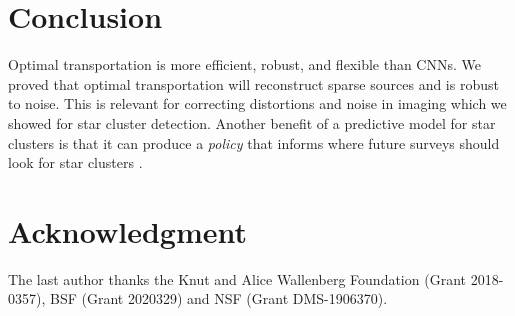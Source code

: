 \documentclass[conference]{IEEEtran}
\begin{document}
\section{Conclusion}

Optimal transportation is more efficient, robust, and flexible than CNNs. We proved that optimal transportation will reconstruct sparse sources and is robust to noise. This is relevant for correcting distortions and noise in imaging which we showed for star cluster detection. Another benefit of a predictive model for star clusters is that it can produce a \emph{policy} that informs where future surveys should look for star clusters \cite{rawson, freeman}. 

\section*{Acknowledgment}
The last author thanks the Knut and Alice Wallenberg Foundation (Grant 2018-0357), BSF (Grant 2020329) and NSF (Grant DMS-1906370).
\end{document}

